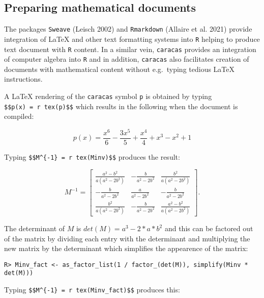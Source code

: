 \hypertarget{preparing-mathematical-documents}{%
\subsection{Preparing mathematical documents}\label{preparing-mathematical-documents}}

The packages \texttt{Sweave} (Leisch 2002) and \texttt{Rmarkdown} (Allaire et al. 2021) provide
integration of LaTeX and other text formatting systems into \texttt{R} helping to produce
text document with \texttt{R} content. In a similar vein, \texttt{caracas} provides an integration
of computer algebra into \texttt{R} and in addition, \texttt{caracas} also facilitates creation
of documents with mathematical content without e.g.~typing tedious
LaTeX instructions.

A LaTeX rendering of the \texttt{caracas} symbol \texttt{p} is obtained by typing
\texttt{\$\$p(x)\ =\ \textasciigrave{}r\ tex(p)\textasciigrave{}\$\$} which results in the following when the document is compiled:

\[
p(x) = \frac{x^{6}}{6} - \frac{3 x^{5}}{5} + \frac{x^{4}}{4} + x^{3} - x^{2} + 1
\]

Typing \texttt{\$\$M\^{}\{-1\}\ =\ \textasciigrave{}r\ tex(Minv)\textasciigrave{}\$\$}
produces the result:

\[
M^{-1} = \left[\begin{matrix}\frac{a^{2} - b^{2}}{a \left(a^{2} - 2 b^{2}\right)} & - \frac{b}{a^{2} - 2 b^{2}} & \frac{b^{2}}{a \left(a^{2} - 2 b^{2}\right)}\\- \frac{b}{a^{2} - 2 b^{2}} & \frac{a}{a^{2} - 2 b^{2}} & - \frac{b}{a^{2} - 2 b^{2}}\\\frac{b^{2}}{a \left(a^{2} - 2 b^{2}\right)} & - \frac{b}{a^{2} - 2 b^{2}} & \frac{a^{2} - b^{2}}{a \left(a^{2} - 2 b^{2}\right)}\end{matrix}\right] .
\]

The determinant of \(M\) is \(det(M)=a^3 - 2*a*b^2\) and this can be factored out of the matrix by dividing each entry with the determinant and multiplying the new matrix by the determinant which simplifies the appearence of the matrix:

\begin{verbatim}
R> Minv_fact <- as_factor_list(1 / factor_(det(M)), simplify(Minv * det(M)))
\end{verbatim}

Typing \texttt{\$\$M\^{}\{-1\}\ =\ \textasciigrave{}r\ tex(Minv\_fact)\textasciigrave{}\$\$} produces this:

